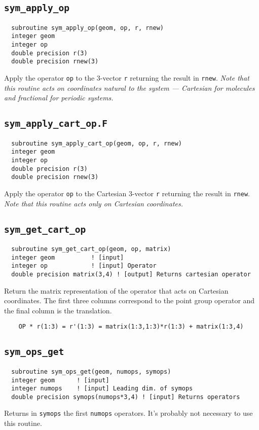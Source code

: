 \subsection{{\tt sym\_apply\_op}}
\begin{verbatim}
  subroutine sym_apply_op(geom, op, r, rnew)
  integer geom
  integer op
  double precision r(3)
  double precision rnew(3)
\end{verbatim}
Apply the operator \verb+op+ to the 3-vector \verb+r+ returning the
result in \verb+rnew+.  {\em Note that this routine acts on
  coordinates natural to the system --- Cartesian for molecules and
  fractional for periodic systems.}

\subsection{{\tt sym\_apply\_cart\_op.F}}
\begin{verbatim}
  subroutine sym_apply_cart_op(geom, op, r, rnew)
  integer geom
  integer op
  double precision r(3)
  double precision rnew(3)
\end{verbatim}
Apply the operator \verb+op+ to the Cartesian 3-vector \verb+r+
returning the result in \verb+rnew+.  {\em Note that this routine acts
  only on Cartesian coordinates.}

\subsection{{\tt sym\_get\_cart\_op}}
\begin{verbatim}
  subroutine sym_get_cart_op(geom, op, matrix)
  integer geom          ! [input]
  integer op            ! [input] Operator
  double precision matrix(3,4) ! [output] Returns cartesian operator
\end{verbatim}
Return the matrix representation of the operator that acts on
Cartesian coordinates.  The first three columns correspond to the
point group operator and the final column is the translation.

\begin{verbatim}
    OP * r(1:3) = r'(1:3) = matrix(1:3,1:3)*r(1:3) + matrix(1:3,4)
\end{verbatim}

\subsection{{\tt sym\_ops\_get}}
\begin{verbatim}
  subroutine sym_ops_get(geom, numops, symops)
  integer geom      ! [input]
  integer numops    ! [input] Leading dim. of symops
  double precision symops(numops*3,4) ! [input] Returns operators
\end{verbatim}
Returns in \verb+symops+ the first \verb+numops+ operators.  It's 
probably not necessary to use this routine.

